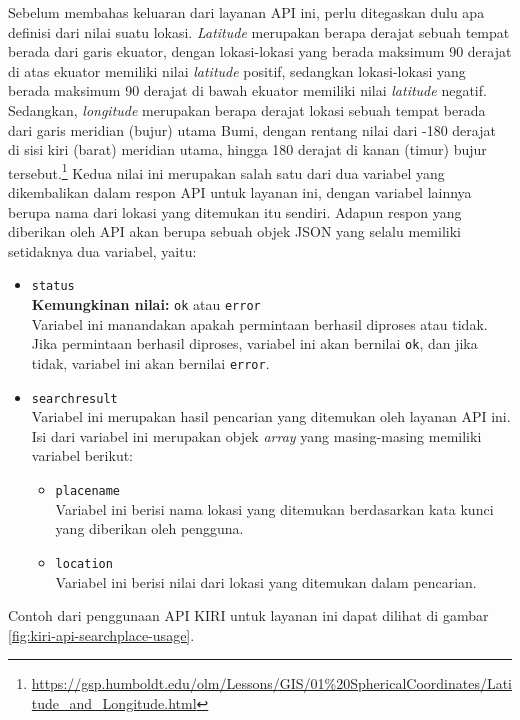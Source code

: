 \documentclass[a4paper,twoside]{article}
\begin{document}
\begin{enumerate}
Sebelum membahas keluaran dari layanan API ini, perlu ditegaskan dulu apa definisi dari nilai \latlon suatu lokasi. \textit{Latitude} merupakan berapa derajat sebuah tempat berada dari garis ekuator, dengan lokasi-lokasi yang berada maksimum 90 derajat di atas ekuator memiliki nilai \textit{latitude} positif, sedangkan lokasi-lokasi yang berada maksimum 90 derajat di bawah ekuator memiliki nilai \textit{latitude} negatif. Sedangkan, \textit{longitude} merupakan berapa derajat lokasi sebuah tempat berada dari garis meridian (bujur) utama Bumi, dengan rentang nilai dari -180 derajat di sisi kiri (barat) meridian utama, hingga 180 derajat di kanan (timur) bujur tersebut.\footnote{\href{https://gsp.humboldt.edu/olm/Lessons/GIS/01\%20SphericalCoordinates/Latitude\_and\_Longitude.html}{https://gsp.humboldt.edu/olm/Lessons/GIS/01\%20SphericalCoordinates/Latitude\_and\_Longitude.html}} Kedua nilai ini merupakan salah satu dari dua variabel yang dikembalikan dalam respon API untuk layanan ini, dengan variabel lainnya berupa nama dari lokasi yang ditemukan itu sendiri. Adapun respon yang diberikan oleh API akan berupa sebuah objek JSON yang selalu memiliki setidaknya dua variabel, yaitu:
\vfill\newpage %
\begin{itemize}
	\item \verb|status|\\
	\textbf{Kemungkinan nilai:} \verb|ok| atau \verb|error|\\
	Variabel ini manandakan apakah permintaan berhasil diproses atau tidak. Jika permintaan \mbox{berhasil} diproses, variabel ini akan bernilai \verb|ok|, dan jika tidak, variabel ini akan bernilai \verb|error|.
	\item \verb|searchresult|\\
	Variabel ini merupakan hasil pencarian yang ditemukan oleh layanan API ini. Isi dari variabel ini merupakan objek \textit{array} yang masing-masing memiliki variabel berikut:
	
	\begin{itemize}
		\item \verb|placename|\\
		Variabel ini berisi nama lokasi yang ditemukan berdasarkan kata kunci yang diberikan oleh pengguna.
		\item \verb|location|\\
		Variabel ini berisi nilai \latlon dari lokasi yang ditemukan dalam pencarian.
	\end{itemize}
	
\end{itemize}
\noindent
Contoh dari penggunaan API KIRI untuk layanan ini dapat dilihat di gambar \ref{fig:kiri-api-searchplace-usage}.


\end{enumerate}
\end{document}
